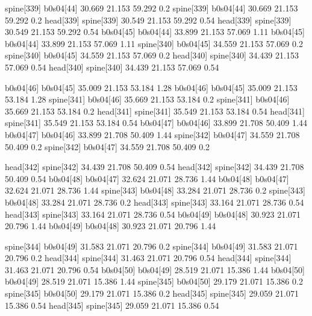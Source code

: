 spine[339]    b0s04[44]    30.669    21.153    59.292    0.2
spine[339]    b0s04[44]    30.669    21.153    59.292    0.2
head[339]    spine[339]    30.549    21.153    59.292    0.54
head[339]    spine[339]    30.549    21.153    59.292    0.54
b0s04[45]    b0s04[44]    33.899    21.153    57.069    1.11
b0s04[45]    b0s04[44]    33.899    21.153    57.069    1.11
spine[340]    b0s04[45]    34.559    21.153    57.069    0.2
spine[340]    b0s04[45]    34.559    21.153    57.069    0.2
head[340]    spine[340]    34.439    21.153    57.069    0.54
head[340]    spine[340]    34.439    21.153    57.069    0.54


b0s04[46]    b0s04[45]    35.009    21.153    53.184    1.28
b0s04[46]    b0s04[45]    35.009    21.153    53.184    1.28
spine[341]    b0s04[46]    35.669    21.153    53.184    0.2
spine[341]    b0s04[46]    35.669    21.153    53.184    0.2
head[341]    spine[341]    35.549    21.153    53.184    0.54
head[341]    spine[341]    35.549    21.153    53.184    0.54
b0s04[47]    b0s04[46]    33.899    21.708    50.409    1.44
b0s04[47]    b0s04[46]    33.899    21.708    50.409    1.44
spine[342]    b0s04[47]    34.559    21.708    50.409    0.2
spine[342]    b0s04[47]    34.559    21.708    50.409    0.2


head[342]    spine[342]    34.439    21.708    50.409    0.54
head[342]    spine[342]    34.439    21.708    50.409    0.54
b0s04[48]    b0s04[47]    32.624    21.071    28.736    1.44
b0s04[48]    b0s04[47]    32.624    21.071    28.736    1.44
spine[343]    b0s04[48]    33.284    21.071    28.736    0.2
spine[343]    b0s04[48]    33.284    21.071    28.736    0.2
head[343]    spine[343]    33.164    21.071    28.736    0.54
head[343]    spine[343]    33.164    21.071    28.736    0.54
b0s04[49]    b0s04[48]    30.923    21.071    20.796    1.44
b0s04[49]    b0s04[48]    30.923    21.071    20.796    1.44


spine[344]    b0s04[49]    31.583    21.071    20.796    0.2
spine[344]    b0s04[49]    31.583    21.071    20.796    0.2
head[344]    spine[344]    31.463    21.071    20.796    0.54
head[344]    spine[344]    31.463    21.071    20.796    0.54
b0s04[50]    b0s04[49]    28.519    21.071    15.386    1.44
b0s04[50]    b0s04[49]    28.519    21.071    15.386    1.44
spine[345]    b0s04[50]    29.179    21.071    15.386    0.2
spine[345]    b0s04[50]    29.179    21.071    15.386    0.2
head[345]    spine[345]    29.059    21.071    15.386    0.54
head[345]    spine[345]    29.059    21.071    15.386    0.54



